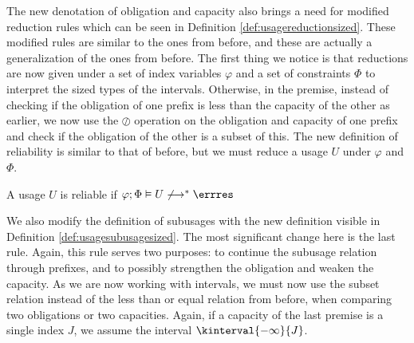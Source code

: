The new denotation of obligation and capacity also brings a need for modified reduction rules which can be seen in Definition \ref{def:usagereductionsized}. These modified rules are similar to the ones from before, and these are actually a generalization of the ones from before. The first thing we notice is that reductions are now given under a set of index variables $\varphi$ and a set of constraints $\Phi$ to interpret the sized types of the intervals. Otherwise, in the premise, instead of checking if the obligation of one prefix is less than the capacity of the other as earlier, we now use the $\oslash$ operation on the obligation and capacity of one prefix and check if the obligation of the other is a subset of this. The new definition of reliability is similar to that of before, but we must reduce a usage $U$ under $\varphi$ and $\Phi$.
%
\begin{defi}
    A usage $U$ is reliable if $\varphi; \Phi \vDash U \not\longrightarrow^* \errres$
    
    \label{def:lockfreedomreliabilitysized}
\end{defi}
%
We also modify the definition of subusages with the new definition visible in Definition \ref{def:usagesubusagesized}. The most significant change here is the last rule. Again, this rule serves two purposes: to continue the subusage relation through prefixes, and to possibly strengthen the obligation and weaken the capacity. As we are now working with intervals, we must now use the subset relation instead of the less than or equal relation from before, when comparing two obligations or two capacities. Again, if a capacity of the last premise is a single index $J$, we assume the interval $\kinterval{-\infty}{J}$.


